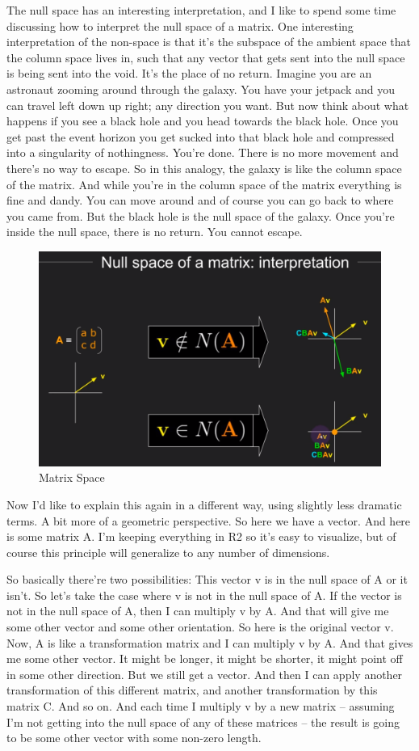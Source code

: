 \documentclass[fleqn,10pt]{olplainarticle}
\theoremstyle{definition}
\theoremstyle{remark}
\begin{document}
The null space has an interesting interpretation, and I like to spend some time discussing how to interpret the null space of a matrix. One interesting interpretation of the non-space is that it's the subspace of the ambient space that the column space lives in, such that any vector that gets sent into the null space is being sent into the void. It's the place of no return. Imagine you are an astronaut zooming around through the galaxy. You have your jetpack and you can travel left down up right; any direction you want. But now think about what happens if you see a black hole and you head towards the black hole. Once you get past the event horizon you get sucked into that black hole and compressed into a singularity of nothingness. You're done. There is no more movement and there's no way to escape. So in this analogy, the galaxy is like the column space of the matrix. And while you're in the column space of the matrix everything is fine and dandy. You can move around and of course you can go back to where you came from. But the black hole is the null space of the galaxy. Once you're inside the null space, there is no return. You cannot escape.

\begin{figure}[ht]
	\centering
	\includegraphics[width=0.5\linewidth]{images/matrix-space-25.png}
	\caption{Matrix Space}
	\label{fig:matrix_space_25}
\end{figure}

Now I'd like to explain this again in a different way, using slightly less dramatic terms. A bit more of a geometric perspective. So here we have a vector. And here is some matrix A. I'm keeping everything in R2 so it's easy to visualize, but of course this principle will generalize to any number of dimensions.

So basically there're two possibilities: This vector v is in the null space of A or it isn't. So let's take the case where v is not in the null space of A. If the vector is not in the null space of A, then I can multiply v by A. And that will give me some other vector and some other orientation. So here is the original vector v. Now, A is like a transformation matrix and I can multiply v by A. And that gives me some other vector. It might be longer, it might be shorter, it might point off in some other direction. But we still get a vector. And then I can apply another transformation of this different matrix, and another transformation by this matrix C. And so on. And each time I multiply v by a new matrix -- assuming I'm not getting into the null space of any of these matrices -- the result is going to be some other vector with some non-zero length.
\end{document}
